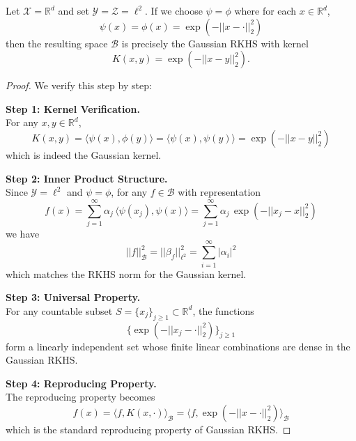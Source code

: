\begin{theorem}
Let $\mathcal{X} = \mathbb{R}^d$ and set $\mathcal{Y} = \mathcal{Z} = \ell^2$. If we choose $\psi = \phi$ where for each $x \in \mathbb{R}^d$,
\begin{equation}
\psi(x) = \phi(x) = \exp(-||x-\cdot||_2^2)
\end{equation}
then the resulting space $\mathcal{B}$ is precisely the Gaussian RKHS with kernel
\begin{equation}
K(x,y) = \exp(-||x-y||_2^2).
\end{equation}
\end{theorem}

\begin{proof}
We verify this step by step:

\medskip
\noindent\textbf{Step 1: Kernel Verification.} \\
For any $x,y \in \mathbb{R}^d$,
\begin{equation}
K(x,y) = \langle \psi(x), \phi(y) \rangle = \langle \psi(x), \psi(y) \rangle = \exp(-||x-y||_2^2)
\end{equation}
which is indeed the Gaussian kernel.

\medskip
\noindent\textbf{Step 2: Inner Product Structure.} \\
Since $\mathcal{Y} = \ell^2$ and $\psi = \phi$, for any $f \in \mathcal{B}$ with representation
\begin{equation}
f(x) = \sum_{j=1}^\infty \alpha_j\, \langle \psi(x_j), \psi(x) \rangle = \sum_{j=1}^\infty \alpha_j\, \exp(-||x_j-x||_2^2)
\end{equation}
we have
\begin{equation}
||f||_{\mathcal{B}}^2 = ||\beta_f||_{\ell^2}^2 = \sum_{i=1}^\infty |\alpha_i|^2
\end{equation}
which matches the RKHS norm for the Gaussian kernel.

\medskip
\noindent\textbf{Step 3: Universal Property.} \\
For any countable subset $S = \{x_j\}_{j\ge1} \subset \mathbb{R}^d$, the functions
\begin{equation}
\{\exp(-||x_j-\cdot||_2^2)\}_{j\ge1}
\end{equation}
form a linearly independent set whose finite linear combinations are dense in the Gaussian RKHS.

\medskip
\noindent\textbf{Step 4: Reproducing Property.} \\
The reproducing property becomes
\begin{equation}
f(x) = \langle f, K(x,\cdot) \rangle_{\mathcal{B}} = \langle f, \exp(-||x-\cdot||_2^2) \rangle_{\mathcal{B}}
\end{equation}
which is the standard reproducing property of Gaussian RKHS.
\end{proof}

